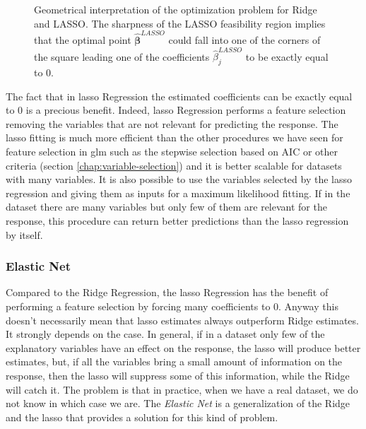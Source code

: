 \documentclass[a4paper, twoside, openright, 12pt]{report}
\theoremstyle{definition}
\theoremstyle{definition}
\theoremstyle{definition}
\theoremstyle{remark}
\begin{document}
\begin{figure}[!hbtp]

{\centering {}

}

\caption[Geometrical interpretation of the optimization problem for Ridge and LASSO.]{Geometrical interpretation of the optimization problem for Ridge and LASSO. The sharpness of the LASSO feasibility region implies that the optimal point \(\hat{\boldsymbol{\beta}}^{LASSO}\) could fall into one of the corners of the square leading one of the coefficients \(\hat{\beta}_j^{LASSO}\) to be exactly equal to \(0\).}\label{fig:opt-ridge-lasso}
\end{figure}

The fact that in \ac{lasso} Regression the estimated coefficients can be exactly equal to \(0\) is a precious benefit. Indeed, \ac{lasso} Regression performs a feature selection removing the variables that are not relevant for predicting the response. The \ac{lasso} fitting is much more efficient than the other procedures we have seen for feature selection in \ac{glm} such as the stepwise selection based on AIC or other criteria (section \ref{chap:variable-selection}) and it is better scalable for datasets with many variables. It is also possible to use the variables selected by the \ac{lasso} regression and giving them as inputs for a maximum likelihood fitting. If in the dataset there are many variables but only few of them are relevant for the response, this procedure can return better predictions than the \ac{lasso} regression by itself.

\hypertarget{elastic-net}{%
\subsubsection{Elastic Net}\label{elastic-net}}

Compared to the Ridge Regression, the \ac{lasso} Regression has the benefit of performing a feature selection by forcing many coefficients to \(0\). Anyway this doesn't necessarily mean that \ac{lasso} estimates always outperform Ridge estimates. It strongly depends on the case. In general, if in a dataset only few of the explanatory variables have an effect on the response, the \ac{lasso} will produce better estimates, but, if all the variables bring a small amount of information on the response, then the \ac{lasso} will suppress some of this information, while the Ridge will catch it. The problem is that in practice, when we have a real dataset, we do not know in which case we are. The \emph{Elastic Net} is a generalization of the Ridge and the \ac{lasso} that provides a solution for this kind of problem.
\end{document}
